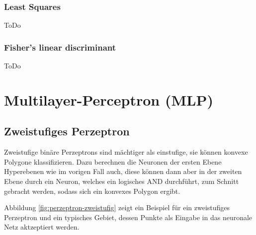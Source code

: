 \subsubsection*{Least Squares}
ToDo

\subsubsection*{Fisher's linear discriminant}
ToDo


\section*{Multilayer-Perceptron (MLP)}
\subsection*{Zweistufiges Perzeptron}
Zweistufige binäre Perzeptrons sind mächtiger als einstufige, sie können konvexe Polygone klassifizieren. Dazu berechnen die Neuronen der ersten Ebene Hyperebenen wie im vorigen Fall auch, diese können dann aber in der zweiten Ebene durch ein Neuron, welches ein logisches AND durchführt, zum Schnitt gebracht werden, sodass sich ein konvexes Polygon ergibt.

Abbildung \ref{fig:perzeptron-zweistufig} zeigt ein Beispiel für ein zweistufiges Perzeptron und ein typisches Gebiet, dessen Punkte als Eingabe in das neuronale Netz aktzeptiert werden.

